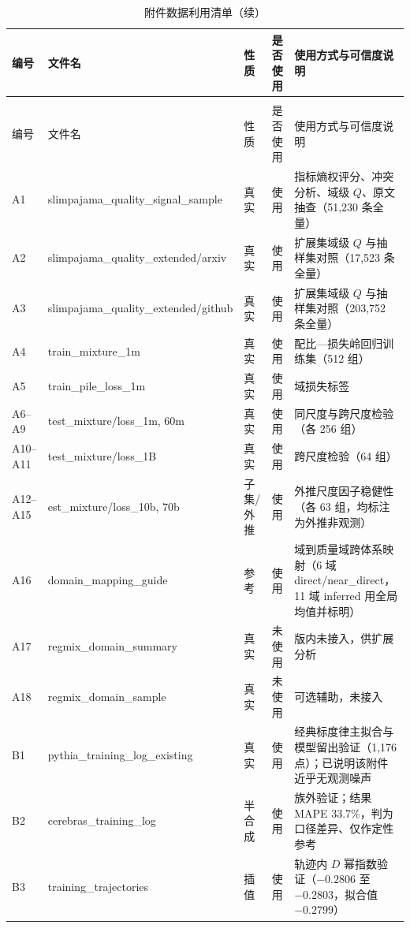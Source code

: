 \begin{longtable}{>{\centering\arraybackslash}p{}>{\raggedright\arraybackslash}p{}>{\centering\arraybackslash}p{}>{\centering\arraybackslash}p{}>{\raggedright\arraybackslash}p{}}
  \caption{附件数据利用清单}
  \label{tab:appendix} \\
  \toprule
  编号 & 文件名 & 性质 & 是否使用 & 使用方式与可信度说明 \\
  \midrule
  \endfirsthead
  \caption{附件数据利用清单（续）} \\
  \toprule
  编号 & 文件名 & 性质 & 是否使用 & 使用方式与可信度说明 \\
  \midrule
  \endhead
  \bottomrule
  \endfoot
  A1 & slimpajama\_quality\_signal\_sample & 真实 & 使用 & 22 指标熵权评分、冲突分析、域级 $Q$、原文抽查（51{,}230 条全量） \\
  A2 & slimpajama\_quality\_extended/arxiv & 真实 & 使用 & 扩展集域级 $Q$ 与抽样集对照（17{,}523 条全量） \\
  A3 & slimpajama\_quality\_extended/github & 真实 & 使用 & 扩展集域级 $Q$ 与抽样集对照（203{,}752 条全量） \\
  A4 & train\_mixture\_1m & 真实 & 使用 & 配比—损失岭回归训练集（512 组） \\
  A5 & train\_pile\_loss\_1m & 真实 & 使用 & 13 域损失标签 \\
  A6--A9 & test\_mixture/loss\_1m, 60m & 真实 & 使用 & 同尺度与跨尺度检验（各 256 组） \\
  A10--A11 & test\_mixture/loss\_1B & 真实 & 使用 & 跨尺度检验（64 组） \\
  A12--A15 & est\_mixture/loss\_10b, 70b & 子集/外推 & 使用 & 外推尺度因子稳健性（各 63 组，均标注为外推非观测） \\
  A16 & domain\_mapping\_guide & 参考 & 使用 & 17 域到质量域跨体系映射（6 域 direct/near\_direct，11 域 inferred 用全局均值并标明） \\
  A17 & regmix\_domain\_summary & 真实 & 未使用 & 版内未接入，供扩展分析 \\
  A18 & regmix\_domain\_sample & 真实 & 未使用 & 可选辅助，未接入 \\
  B1 & pythia\_training\_log\_existing & 真实 & 使用 & 经典标度律主拟合与模型留出验证（1{,}176 点）；已说明该附件近乎无观测噪声 \\
  B2 & cerebras\_training\_log & 半合成 & 使用 & 族外验证；结果 MAPE 33.7\%，判为口径差异、仅作定性参考 \\
  B3 & training\_trajectories & 插值 & 使用 & 轨迹内 $D$ 幂指数验证（$-0.2806$ 至 $-0.2803$，拟合值 $-0.2799$） \\

\end{longtable}

